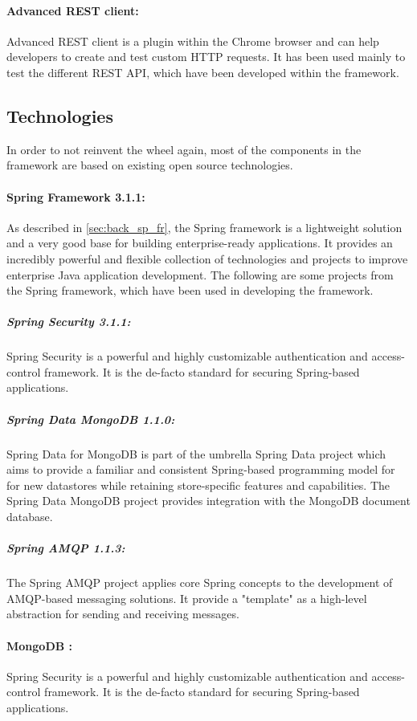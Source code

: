 \paragraph{Advanced REST client:\label{sec:impl_advanced_rest_cl}} Advanced REST client is a plugin within the Chrome browser and can help developers to create and test custom HTTP requests. It has been used mainly to test the different REST API, which have been developed within the framework.

\subsection{Technologies\label{sec:impl_technologies}}
In order to not reinvent the wheel again, most of the components in the framework are based on existing open source technologies. 

\paragraph{Spring Framework 3.1.1:\label{sec:impl_spring}} As described in \ref{sec:back_sp_fr}, the Spring framework is a lightweight solution and a very good base for building enterprise-ready applications. It provides an incredibly powerful and flexible collection of technologies and projects to improve enterprise Java application development. The following are some projects from the Spring framework, which have been used in developing the framework.

\subparagraph{Spring Security 3.1.1:\label{sec:impl_spring_sec}} Spring Security is a powerful and highly customizable authentication and access-control framework. It is the de-facto standard for securing Spring-based applications.

\subparagraph{Spring Data MongoDB 1.1.0:\label{sec:impl_spring_data}} Spring Data for MongoDB is part of the umbrella Spring Data project which aims to provide a familiar and consistent Spring-based programming model for for new datastores while retaining store-specific features and capabilities. The Spring Data MongoDB project provides integration with the MongoDB document database.

\subparagraph{Spring AMQP 1.1.3:\label{sec:impl_spring_amqp}} The Spring AMQP project applies core Spring concepts to the development of AMQP-based messaging solutions. It provide a "template" as a high-level abstraction for sending and receiving messages.

\paragraph{MongoDB :\label{sec:impl_spring_sec}} Spring Security is a powerful and highly customizable authentication and access-control framework. It is the de-facto standard for securing Spring-based applications.
